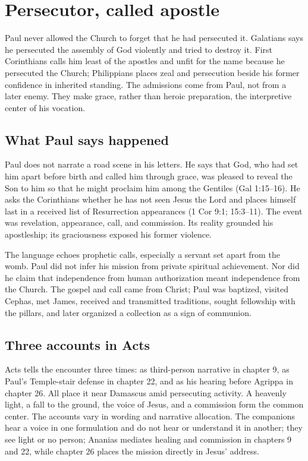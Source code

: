 \section{Persecutor, called apostle}\label{sec:paul-call}

Paul never allowed the Church to forget that he had persecuted it. Galatians
says he persecuted the assembly of God violently and tried to destroy it.
First Corinthians calls him least of the apostles and unfit for the name
because he persecuted the Church; Philippians places zeal and persecution
beside his former confidence in inherited standing. The admissions come from
Paul, not from a later enemy. They make grace, rather than heroic preparation,
the interpretive center of his vocation.

\subsection{What Paul says happened}

Paul does not narrate a road scene in his letters. He says that God, who had
set him apart before birth and called him through grace, was pleased to reveal
the Son to him so that he might proclaim him among the Gentiles (Gal
1:15--16). He asks the Corinthians whether he has not seen Jesus the Lord and
places himself last in a received list of Resurrection appearances (1 Cor
9:1; 15:3--11). The event was revelation, appearance, call, and commission.
Its reality grounded his apostleship; its graciousness exposed his former
violence.

The language echoes prophetic calls, especially a servant set apart from the
womb. Paul did not infer his mission from private spiritual achievement. Nor
did he claim that independence from human authorization meant independence
from the Church. The gospel and call came from Christ; Paul was baptized,
visited Cephas, met James, received and transmitted traditions, sought
fellowship with the pillars, and later organized a collection as a sign of
communion.

\subsection{Three accounts in Acts}

Acts tells the encounter three times: as third-person narrative in chapter 9,
as Paul's Temple-stair defense in chapter 22, and as his hearing before
Agrippa in chapter 26. All place it near Damascus amid persecuting activity.
A heavenly light, a fall to the ground, the voice of Jesus, and a commission
form the common center. The accounts vary in wording and narrative allocation.
The companions hear a voice in one formulation and do not hear or understand
it in another; they see light or no person; Ananias mediates healing and
commission in chapters 9 and 22, while chapter 26 places the mission directly
in Jesus' address.

